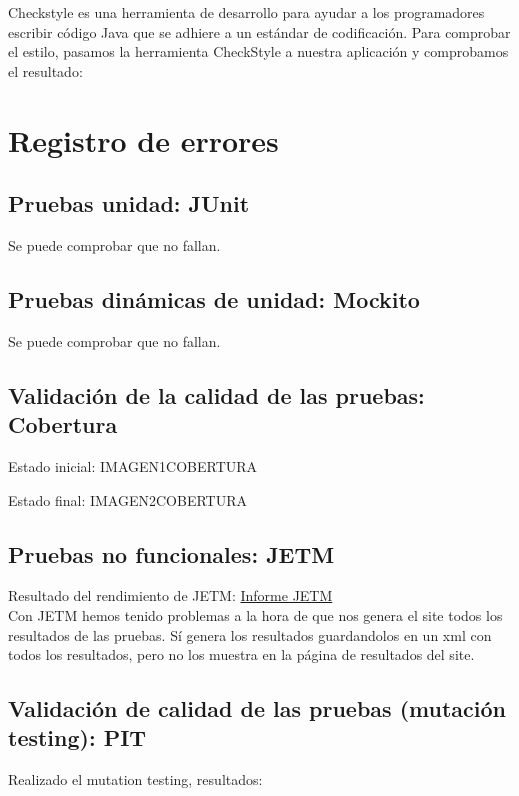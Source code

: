 \documentclass[DIV=calc,paper=a4,fontsize=11pt,onecolumn]{scrartcl} %
\begin{document}
	Checkstyle es una herramienta de desarrollo para ayudar a los programadores escribir código Java que se adhiere a un estándar de codificación. 
	Para comprobar el estilo, pasamos la herramienta CheckStyle a nuestra aplicación y comprobamos el resultado:
	
	
	\section{Registro de errores}
	\subsection{Pruebas unidad: JUnit}
	Se puede comprobar que no fallan.
	
	\subsection{Pruebas dinámicas de unidad: Mockito}
	Se puede comprobar que no fallan.
	
	\subsection{Validación de la calidad de las pruebas: Cobertura}
	
	Estado inicial:
	IMAGEN1COBERTURA
	
	Estado final:
	IMAGEN2COBERTURA
	
	\subsection{Pruebas no funcionales: JETM}
	Resultado del rendimiento de JETM:
	\href{Informes/SiteTestInicial/jetm-timing-report.html}{Informe JETM} \\
	
	Con JETM hemos tenido problemas  a la hora de que nos genera el site todos los resultados de las pruebas. Sí genera los resultados guardandolos en un xml con todos los resultados, pero no los muestra en la página de resultados del site.
	\subsection{Validación de calidad de las pruebas (mutación testing): PIT}
	Realizado el mutation testing, resultados:
	
\end{document}
